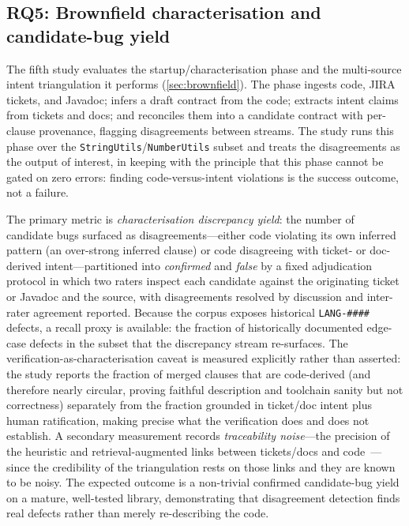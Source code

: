 \subsection{RQ5: Brownfield characterisation and candidate-bug yield}\label{subsec:eval_rq5}

The fifth study evaluates the startup/characterisation phase and the multi-source intent triangulation it performs (\cref{sec:brownfield}). The phase ingests code, JIRA tickets, and Javadoc; infers a draft contract from the code; extracts intent claims from tickets and docs; and reconciles them into a candidate contract with per-clause provenance, flagging disagreements between streams. The study runs this phase over the \texttt{StringUtils}/\texttt{NumberUtils} subset and treats the disagreements as the output of interest, in keeping with the principle that this phase cannot be gated on zero errors: finding code-versus-intent violations is the success outcome, not a failure.

The primary metric is \emph{characterisation discrepancy yield}: the number of candidate bugs surfaced as disagreements---either code violating its own inferred pattern (an over-strong inferred clause) or code disagreeing with ticket- or doc-derived intent---partitioned into \emph{confirmed} and \emph{false} by a fixed adjudication protocol in which two raters inspect each candidate against the originating ticket or Javadoc and the source, with disagreements resolved by discussion and inter-rater agreement reported. Because the corpus exposes historical \texttt{LANG-\#\#\#\#} defects, a recall proxy is available: the fraction of historically documented edge-case defects in the subset that the discrepancy stream re-surfaces. The verification-as-characterisation caveat is measured explicitly rather than asserted: the study reports the fraction of merged clauses that are code-derived (and therefore nearly circular, proving faithful description and toolchain sanity but not correctness) separately from the fraction grounded in ticket/doc intent plus human ratification, making precise what the verification does and does not establish. A secondary measurement records \emph{traceability noise}---the precision of the heuristic and retrieval-augmented links between tickets/docs and code~\cite{antoniol2002recovering,borg2014recovering}---since the credibility of the triangulation rests on those links and they are known to be noisy. The expected outcome is a non-trivial confirmed candidate-bug yield on a mature, well-tested library, demonstrating that disagreement detection finds real defects rather than merely re-describing the code.

